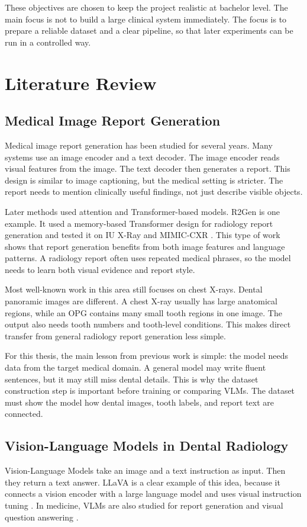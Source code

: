 \documentclass[a4paper,12pt]{report}
\begin{document}
These objectives are chosen to keep the project realistic at bachelor level. The main focus is not to build a large clinical system immediately. The focus is to prepare a reliable dataset and a clear pipeline, so that later experiments can be run in a controlled way.

\section{Literature Review}

\subsection*{Medical Image Report Generation}
Medical image report generation has been studied for several years. Many systems use an image encoder and a text decoder. The image encoder reads visual features from the image. The text decoder then generates a report. This design is similar to image captioning, but the medical setting is stricter. The report needs to mention clinically useful findings, not just describe visible objects.

Later methods used attention and Transformer-based models. R2Gen is one example. It used a memory-based Transformer design for radiology report generation and tested it on IU X-Ray and MIMIC-CXR \cite{chen2020r2gen}. This type of work shows that report generation benefits from both image features and language patterns. A radiology report often uses repeated medical phrases, so the model needs to learn both visual evidence and report style.

Most well-known work in this area still focuses on chest X-rays. Dental panoramic images are different. A chest X-ray usually has large anatomical regions, while an OPG contains many small tooth regions in one image. The output also needs tooth numbers and tooth-level conditions. This makes direct transfer from general radiology report generation less simple.

For this thesis, the main lesson from previous work is simple: the model needs data from the target medical domain. A general model may write fluent sentences, but it may still miss dental details. This is why the dataset construction step is important before training or comparing VLMs. The dataset must show the model how dental images, tooth labels, and report text are connected.
 
\subsection*{Vision-Language Models in Dental Radiology}
Vision-Language Models take an image and a text instruction as input. Then they return a text answer. LLaVA is a clear example of this idea, because it connects a vision encoder with a large language model and uses visual instruction tuning \cite{liu2023visual}. In medicine, VLMs are also studied for report generation and visual question answering \cite{hartsock2024vlmreview}.
\end{document}
